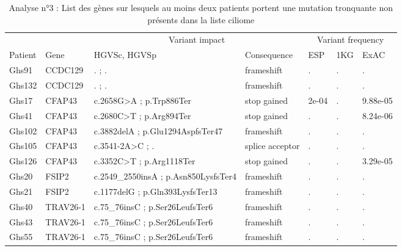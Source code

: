 \documentclass[12pt,twoside]{reedthesis}
\theoremstyle{definition}
\theoremstyle{definition}
\theoremstyle{remark}
\begin{document}
  \begin{landscape}
  \begin{longtable}[t]{lllllll}
  \caption{\label{tab:tabgrp2high}Analyse n°3 : List des gènes sur lesquels au moins deux patients portent une mutation tronquante non présents dans la liste ciliome}\\
  \toprule
  \multicolumn{1}{c}{ } & \multicolumn{1}{c}{ } & \multicolumn{2}{c}{Variant impact} & \multicolumn{3}{c}{Variant frequency} \\
  \cmidrule(l{2pt}r{2pt}){3-4} \cmidrule(l{2pt}r{2pt}){5-7}
  Patient & Gene & HGVSc, HGVSp & Consequence & ESP & 1KG & ExAC\\
  \midrule
  Ghs91 & CCDC129 & . ; . & frameshift & . & . & .\\
  Ghs132 & CCDC129 & . ; . & frameshift & . & . & .\\
  Ghs17 & CFAP43 & c.2658G>A ; p.Trp886Ter & stop gained & 2e-04 & . & 9.88e-05\\
  Ghs41 & CFAP43 & c.2680C>T ; p.Arg894Ter & stop gained & . & . & 8.24e-06\\
  Ghs102 & CFAP43 & c.3882delA ; p.Glu1294AspfsTer47 & frameshift & . & . & .\\
  \addlinespace
  Ghs105 & CFAP43 & c.3541-2A>C ; . & splice acceptor & . & . & .\\
  Ghs126 & CFAP43 & c.3352C>T ; p.Arg1118Ter & stop gained & . & . & 3.29e-05\\
  Ghs20 & FSIP2 & c.2549\_2550insA ; p.Asn850LysfsTer4 & frameshift & . & . & .\\
  Ghs21 & FSIP2 & c.1177delG ; p.Gln393LysfsTer13 & frameshift & . & . & .\\
  Ghs40 & TRAV26-1 & c.75\_76insC ; p.Ser26LeufsTer6 & frameshift & . & . & .\\
  \addlinespace
  Ghs43 & TRAV26-1 & c.75\_76insC ; p.Ser26LeufsTer6 & frameshift & . & . & .\\
  Ghs55 & TRAV26-1 & c.75\_76insC ; p.Ser26LeufsTer6 & frameshift & . & . & .\\
  \bottomrule
  \end{longtable}
  \end{landscape}
  
  \newpage
  
\end{document}
